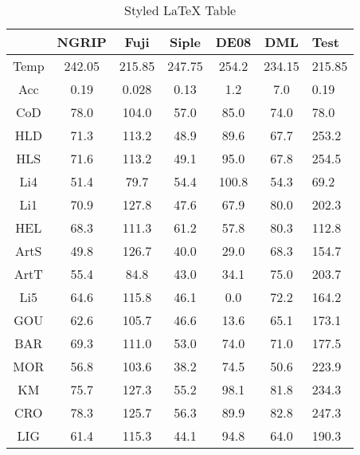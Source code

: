 \begin{table}[h]
\centering
\caption{Styled LaTeX Table}
\label{table:5}
\begin{tabular}{cccccc}
\toprule
 & NGRIP & Fuji & Siple & DE08 & DML & Test \\
\midrule
Temp & 242.05 & 215.85 & 247.75 & 254.2 & 234.15 & 215.85 \\
Acc & 0.19 & 0.028 & 0.13 & 1.2 & 7.0 & 0.19 \\
CoD & 78.0 & 104.0 & 57.0 & 85.0 & 74.0 & 78.0 \\
HLD & 71.3 & 113.2 & 48.9 & 89.6 & 67.7 & 253.2 \\
HLS & 71.6 & 113.2 & 49.1 & 95.0 & 67.8 & 254.5 \\
Li4 & 51.4 & 79.7 & 54.4 & 100.8 & 54.3 & 69.2 \\
Li1 & 70.9 & 127.8 & 47.6 & 67.9 & 80.0 & 202.3 \\
HEL & 68.3 & 111.3 & 61.2 & 57.8 & 80.3 & 112.8 \\
ArtS & 49.8 & 126.7 & 40.0 & 29.0 & 68.3 & 154.7 \\
ArtT & 55.4 & 84.8 & 43.0 & 34.1 & 75.0 & 203.7 \\
Li5 & 64.6 & 115.8 & 46.1 & 0.0 & 72.2 & 164.2 \\
GOU & 62.6 & 105.7 & 46.6 & 13.6 & 65.1 & 173.1 \\
BAR & 69.3 & 111.0 & 53.0 & 74.0 & 71.0 & 177.5 \\
MOR & 56.8 & 103.6 & 38.2 & 74.5 & 50.6 & 223.9 \\
KM & 75.7 & 127.3 & 55.2 & 98.1 & 81.8 & 234.3 \\
CRO & 78.3 & 125.7 & 56.3 & 89.9 & 82.8 & 247.3 \\
LIG & 61.4 & 115.3 & 44.1 & 94.8 & 64.0 & 190.3 \\
\bottomrule
\end{tabular}
\end{table}
